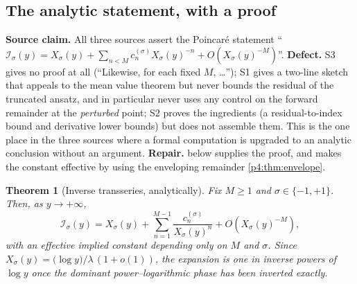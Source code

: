 \documentclass[11pt,a4paper,oneside]{book}
\theoremstyle{plain}
\newtheorem{theorem}{Theorem}[chapter]
\theoremstyle{definition}
\theoremstyle{remark}
\newcommand{\Xcore}{X}
\begin{document}
\subsection{The analytic statement, with a proof}

\begin{repairbox}
\textbf{Source claim.}  All three sources assert the Poincar\'e statement
``$\mathcal I_\sigma(y)=\Xcore_\sigma(y)+\sum_{n<M}c^{(\sigma)}_n
\Xcore_\sigma(y)^{-n}+O(\Xcore_\sigma(y)^{-M})$''.  \textbf{Defect.}
\textsf{S3} gives no proof at all (``Likewise, for each fixed $M$, \ldots'');
\textsf{S1} gives a two-line sketch that appeals to the mean value theorem but
never bounds the residual of the truncated ansatz, and in particular never
uses any control on the forward remainder at the \emph{perturbed} point;
\textsf{S2} proves the ingredients (a residual-to-index bound and derivative
lower bounds) but does not assemble them.  This is the one place in the three
sources where a formal computation is upgraded to an analytic conclusion
without an argument.  \textbf{Repair.}   below
supplies the proof, and makes the constant effective by using the enveloping
remainder \cref{p4:thm:envelope}.
\end{repairbox}

\begin{theorem}[Inverse transseries, analytically]
\label{p4:thm:inverse-analytic}
Fix $M\ge1$ and $\sigma\in\{-1,+1\}$.  Then, as $y\to+\infty$,
\begin{equation}
  \boxed{\;
  \mathcal I_\sigma(y)=\Xcore_\sigma(y)
   +\sum_{n=1}^{M-1}\frac{c^{(\sigma)}_n}{\Xcore_\sigma(y)^{n}}
   +O\!\left(\Xcore_\sigma(y)^{-M}\right),\;}
  \label{p4:eq:inverse-analytic}
\end{equation}
with an effective implied constant depending only on $M$ and $\sigma$.  Since
$\Xcore_\sigma(y)=\bigl(\log y\bigr)/\lambda\,(1+o(1))$, the expansion is one
in inverse powers of $\log y$ once the dominant power--logarithmic phase has
been inverted exactly.
\end{theorem}
\end{document}
